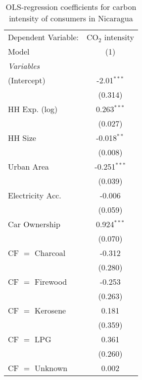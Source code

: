 
\begin{table}[htbp!]
   \centering
   \small
   \begin{adjustbox}{width = 1\textwidth, max height = 0.95\textheight, center}
      \begin{threeparttable}[b]
         \caption{\label{tab:OLS_1_NIC} OLS-regression coefficients for carbon intensity of consumers in Nicaragua}
         \begin{tabular}{lc}
            \tabularnewline \midrule \midrule
            Dependent Variable: & CO$_{2}$ intensity\\  
            Model               & (1)\\  
            \midrule
            \emph{Variables}\\
            (Intercept)         & -2.01$^{***}$\\   
                                & (0.314)\\   
            HH Exp. (log)       & 0.263$^{***}$\\   
                                & (0.027)\\   
            HH Size             & -0.018$^{**}$\\   
                                & (0.008)\\   
            Urban Area          & -0.251$^{***}$\\   
                                & (0.039)\\   
            Electricity Acc.    & -0.006\\   
                                & (0.059)\\   
            Car Ownership       & 0.924$^{***}$\\   
                                & (0.070)\\   
            CF $=$ Charcoal     & -0.312\\   
                                & (0.280)\\   
            CF $=$ Firewood     & -0.253\\   
                                & (0.263)\\   
            CF $=$ Kerosene     & 0.181\\   
                                & (0.359)\\   
            CF $=$ LPG          & 0.361\\   
                                & (0.260)\\   
            CF $=$ Unknown      & 0.002\\   

\end{tabular}
\end{threeparttable}
\end{adjustbox}
\end{table}
